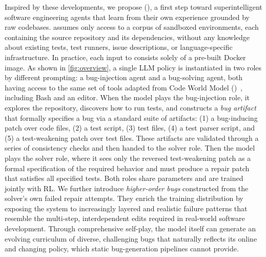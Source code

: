 Inspired by these developments, we propose \techfull (\tech), a first step toward superintelligent software engineering agents that learn from their own experience grounded by raw codebases.
\tech assumes only access to a corpus of sandboxed environments, each containing the source repository and its dependencies, without any knowledge about existing tests, test runners, issue descriptions, or language-specific infrastructure.
In practice, each input to \tech consists solely of a pre-built Docker image.
As shown in \cref{fig:overview},
a single LLM policy is instantiated in two roles by different prompting: a bug-injection agent and a bug-solving agent, both having access to the same set of tools adapted from Code World Model (\cwm)~\cite{faircodegenteam2025cwmopenweightsllmresearch}, including Bash and an editor.
When the model plays the bug-injection role, it explores the repository, discovers how to run tests, and constructs a \emph{bug artifact} that formally specifies a bug via a standard suite of artifacts: (1) a bug-inducing patch over code files, (2) a test script, (3) test files, (4) a test parser script, and (5) a test-weakening patch over test files. These artifacts are validated through a series of consistency checks and then handed to the solver role. Then the model plays the solver role, where it sees only the reversed test-weakening patch as a formal specification of the required behavior and must produce a repair patch that satisfies all specified tests. Both roles share parameters and are trained jointly with RL.
We further introduce \emph{higher-order bugs} constructed from the solver’s own failed repair attempts. They enrich the training distribution by exposing the system to  increasingly layered and realistic failure patterns that resemble the multi-step, interdependent edits required in real-world software development.
Through comprehensive self-play, the model itself can generate an evolving curriculum of diverse, challenging bugs that naturally reflects its online and changing policy,
which static bug-generation pipelines cannot provide.

